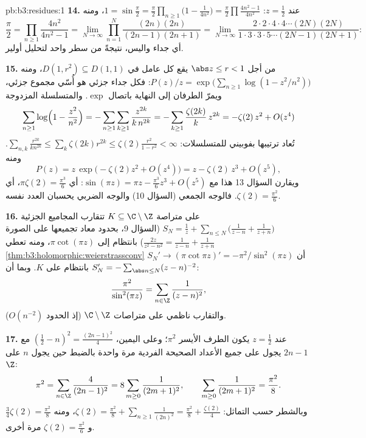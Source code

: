 \begin{solution}{pb:b3:residues:1}
\textbf{14.} عند $z = \frac12$: $1 = \sin\frac\pi2 =
\frac\pi2\prod_{n\geq1}\bigl(1 - \frac1{4n^2}\bigr) =
\frac\pi2\prod\frac{4n^2-1}{4n^2}$، ومنه
\[
\frac\pi2 = \prod_{n\geq1}\frac{4n^2}{4n^2 - 1}
= \lim_{N\to\infty}\prod_{n=1}^N
\frac{(2n)(2n)}{(2n-1)(2n+1)}
= \lim_{N\to\infty}
\frac{2\cdot2\cdot4\cdot4\cdots(2N)(2N)}
{1\cdot3\cdot3\cdot5\cdots(2N-1)(2N+1)} :
\]
أي جداء واليس، نتيجةً من سطر واحد لتحليل أولير.

\textbf{15.} من أجل $\abs z \leq r < 1$ يقع كل عامل في $D(1, r^2) \subseteq D(1, 1)$، ومنه
$P(z)/z = \exp\bigl(
\sum_{n\geq1}\log(1 - z^2/n^2)\bigr)$: فكل جداء جزئي هو أُسّي مجموع جزئي، ويمرّ الطرفان إلى
النهاية باتصال $\exp$. والمتسلسلة المزدوجة
\[
\sum_{n\geq1}\log\Bigl(1 - \frac{z^2}{n^2}\Bigr)
= -\sum_{n\geq1}\sum_{k\geq1}\frac{z^{2k}}{k\,n^{2k}}
= -\sum_{k\geq1}\frac{\zeta(2k)}k\,z^{2k}
= -\zeta(2)\,z^2 + O(z^4)
\]
تُعاد ترتيبها بفوبيني للمتسلسلات: $\sum_{n,k}
\frac{r^{2k}}{kn^{2k}} \leq \sum_k\zeta(2k)r^{2k} \leq
\zeta(2)\frac{r^2}{1-r^2} < \infty$. ومنه
\[
P(z) = z\,\exp\bigl(-\zeta(2)z^2 + O(z^4)\bigr)
= z - \zeta(2)\,z^3 + O(z^5) ,
\]
ويقارن السؤال 13 هذا مع $\sin(\pi z) = \pi z -
\frac{\pi^3}6z^3 + O(z^5)$: أي $\pi\zeta(2) = \frac{\pi^3}6$، أي $\zeta(2) = \frac{\pi^2}6$. فالوجه
الجمعي (السؤال 10) والوجه الضربي يحسبان العدد نفسه.

\textbf{16.} على متراصة $K \subseteq \C\setminus\Z$ تتقارب المجاميع الجزئية $S_N = \frac1z + \sum_{n\leq N}\bigl(
\frac1{z-n} + \frac1{z+n}\bigr)$
(السؤال 9، بحدود معاد تجميعها على الصورة $\frac{2z}{z^2-n^2} = \frac1{z-n} +
\frac1{z+n}$) بانتظام إلى
$\pi\cot(\pi z)$، ومنه تعطي \cref{thm:b3:holomorphic:weierstrassconv} أن $S_N' \to
(\pi\cot\pi z)' = -\pi^2/\sin^2(\pi z)$ بانتظام على
$K$. وبما أن $S_N' = -\sum_{\abs n\leq N}(z - n)^{-2}$:
\[
\frac{\pi^2}{\sin^2(\pi z)} =
\sum_{n\in\Z}\frac1{(z - n)^2} ,
\]
والتقارب ناظمي على متراصات $\C\setminus\Z$ (إذ الحدود
$O(n^{-2})$).

\textbf{17.} عند $z = \frac12$ يكون الطرف الأيسر $\pi^2$؛ وعلى
اليمين، $(\frac12 - n)^2 = \frac{(2n-1)^2}4$ مع $2n -
1$ يجول على جميع الأعداد الصحيحة
الفردية مرة واحدة بالضبط حين يجول $n$ على $\Z$:
\[
\pi^2 = \sum_{n\in\Z}\frac{4}{(2n-1)^2}
= 8\sum_{m\geq0}\frac1{(2m+1)^2},
\qquad
\sum_{m\geq0}\frac1{(2m+1)^2} = \frac{\pi^2}8 .
\]
وبالشطر حسب التماثل: $\zeta(2) = \frac{\pi^2}8 +
\sum_{n\geq1}\frac1{(2n)^2} = \frac{\pi^2}8 +
\frac{\zeta(2)}4$، ومنه $\frac34\zeta(2) = \frac{\pi^2}8$ و $\zeta(2) = \frac{\pi^2}6$ مرة أخرى.


\end{solution}
